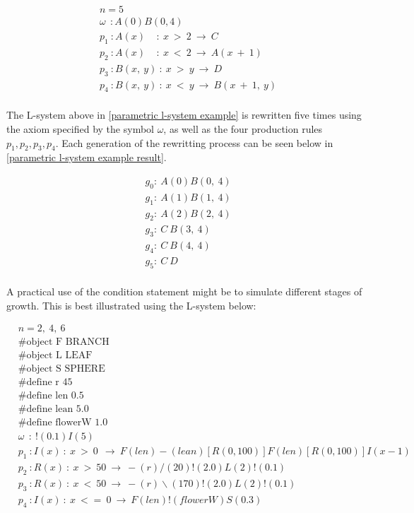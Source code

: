 \begin{equation} \label{parametric l-system example}
\begin{aligned}
	&n=5 \\
	&\omega~~ : A(0)B(0,4)\\
	&p_1~ :  A(x)~~~~~ :~ x~ >~ 2~ \rightarrow~ C\\
	&p_2~ :  A(x)~~~~~ :~ x~ <~ 2~ \rightarrow~ A(x~ +~ 1)\\
	&p_3~ :  B(x,~ y)~ :~ x~ >~ y~ \rightarrow~ D\\
	&p_4~ :  B(x,~ y)~ :~ x~ <~ y~ \rightarrow~ B(x~ +~ 1,~ y)\\
\end{aligned}
\end{equation}

\noindent
The L-system above in \ref{parametric l-system example} is rewritten five times using the axiom specified by the symbol $\omega$, as well as the four production rules $p_1, p_2, p_3, p_4$. Each generation of the rewritting process can be seen below in \ref{parametric l-system example result}.

\begin{equation} \label{parametric l-system example result}
\begin{aligned}
	&g_0 :~ A(0)B(0,~4)\\
	&g_1 :~ A(1)B(1,~4)\\
	&g_2 :~ A(2)B(2,~4)\\
	&g_3 :~ C~B(3,~4)\\
	&g_4 :~ C~B(4,~4)\\
	&g_5 :~ C~D\\
\end{aligned}
\end{equation}

\noindent
A practical use of the condition statement might be to simulate different stages of growth. This is best illustrated using the L-system below: 

\begin{equation} \label{conditional l-system example}
\begin{aligned}
	&n=2,~4,~6 \\
	&\#\text{object F BRANCH} \\
 	&\#\text{object L LEAF} \\
	&\#\text{object S SPHERE} \\
	&\#\text{define r 45} \\
	&\#\text{define len 0.5} \\
	&\#\text{define lean 5.0} \\
	&\#\text{define flowerW 1.0} \\
	&\omega~~ :~ !(0.1)I(5)\\
	&p_1~ :  I(x)~ :~ x~ >~ 0~~ \rightarrow~ F(len)-(lean)[R({0, 100})]F(len)[R({0, 100})]I(x-1)\\
	&p_2~ :  R(x)~ :~ x~ >~ 50~ \rightarrow~ -(r)/(20)!(2.0)L(2)!(0.1)\\
	&p_3~ :  R(x)~ :~ x~ <~ 50~ \rightarrow~ -(r)\backslash(170)!(2.0)L(2)!(0.1)\\
	&p_4~ :  I(x)~ :~ x~ <=~ 0~ \rightarrow~ F(len)!(flowerW)S(0.3)\\
\end{aligned}
\end{equation}

